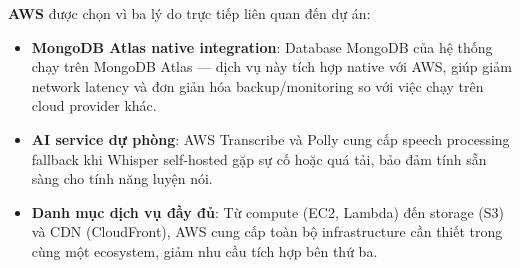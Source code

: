 \textbf{AWS} được chọn vì ba lý do trực tiếp liên quan đến dự án:
\begin{itemize}
\item \textbf{MongoDB Atlas native integration}: Database MongoDB của hệ thống chạy trên MongoDB Atlas --- dịch vụ này tích hợp native với AWS, giúp giảm network latency và đơn giản hóa backup/monitoring so với việc chạy trên cloud provider khác.
\item \textbf{AI service dự phòng}: AWS Transcribe và Polly cung cấp speech processing fallback khi Whisper self-hosted gặp sự cố hoặc quá tải, bảo đảm tính sẵn sàng cho tính năng luyện nói.
\item \textbf{Danh mục dịch vụ đầy đủ}: Từ compute (EC2, Lambda) đến storage (S3) và CDN (CloudFront), AWS cung cấp toàn bộ infrastructure cần thiết trong cùng một ecosystem, giảm nhu cầu tích hợp bên thứ ba. \cite{aws}
\end{itemize}

